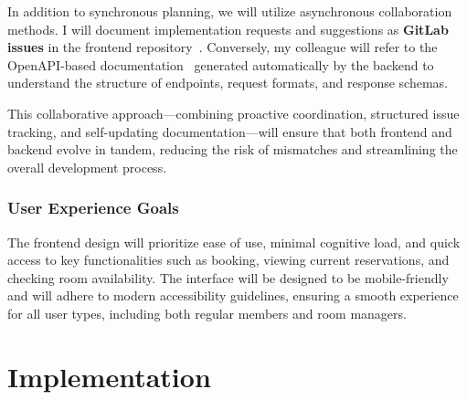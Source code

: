 In addition to synchronous planning, we will utilize asynchronous collaboration methods. I will document implementation requests and suggestions as \textbf{GitLab issues} in the frontend repository~\cite{GitIssues}. Conversely, my colleague will refer to the OpenAPI-based documentation~\cite{OpenAPI} generated automatically by the backend to understand the structure of endpoints, request formats, and response schemas.

This collaborative approach—combining proactive coordination, structured issue tracking, and self-updating documentation—will ensure that both frontend and backend evolve in tandem, reducing the risk of mismatches and streamlining the overall development process.

\subsection{User Experience Goals}

The frontend design will prioritize ease of use, minimal cognitive load, and quick access to key functionalities such as booking, viewing current reservations, and checking room availability. The interface will be designed to be mobile-friendly and will adhere to modern accessibility guidelines, ensuring a smooth experience for all user types, including both regular members and room managers.


\chapter{Implementation}

